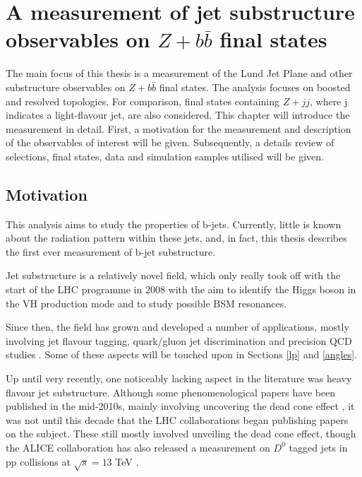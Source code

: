 \documentclass[10pt,a4paper]{book}
\author{Alberto Rescia}
\begin{document}
\chapter{A measurement of jet substructure observables on $Z+b\bar{b}$ final states}

The main focus of this thesis is a measurement of the Lund Jet Plane and other substructure observables on $Z+b\bar{b}$ final states. The analysis focuses on boosted and resolved topologies. For comparison, final states containing $Z+jj$, where j indicates a light-flavour jet, are also considered. This chapter will introduce the measurement in detail. First, a motivation for the measurement and description of the observables of interest will be given. Subsequently, a details review of selections, final states, data and simulation samples utilised will be given. 

\section{Motivation}

This analysis aims to study the properties of b-jets. Currently, little is known about the radiation pattern within these jets, and, in  fact, this thesis describes the first ever measurement of b-jet substructure. 

Jet substructure is a relatively novel field, which only really took off with the start of the LHC programme in 2008 with the aim to identify the Higgs boson in the VH production mode and to study possible BSM resonances. 

Since then, the field has grown and developed a number of applications, mostly involving jet flavour tagging, quark/gluon jet discrimination and precision QCD studies \cite{Larkoski:2014pca, Fedkevych:2022mid, Cavallini:2021vot}. Some of these aspects will be touched upon in Sections \ref{lp} and \ref{angles}.

Up until very recently, one noticeably lacking aspect in the literature was heavy flavour jet substructure. Although some phenomenological papers have been published in the mid-2010s, mainly involving uncovering the dead cone effect \cite{Maltoni:2016ays, Cunqueiro:2018jbh}, it was not until this decade that the LHC collaborations began publishing papers on the subject. These still mostly involved unveiling the dead cone effect, though the ALICE collaboration has also released a measurement on $D^0$ tagged jets in pp collisions at $\sqrt{s} = 13$ TeV \cite{ALICE:2022phr}.
\end{document}
